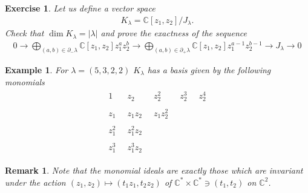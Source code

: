 \documentclass[12pt]{article}
\newtheorem{ex}{Example}[section]
\newtheorem{exer}{Exercise}[section]
\newtheorem{rem}{Remark}[section]
\numberwithin{equation}{section}
\theoremstyle{definition}
\begin{document}
\begin{exer}\normalfont
Let us define a vector space 
\begin{align}\label{klam}
    K_{\lambda} = \mathbb{C}[z_1 , z_2]/J_{\lambda}.
\end{align}    
Check that $\dim K_{\lambda} = |\lambda|$ and prove the exactness of the sequence
\begin{align}\label{resj}
    0 \rightarrow \bigoplus\limits_{(a, b) \in \partial_{-}\lambda} \mathbb{C}[z_1 , z_2] z_1^{a} z_2^{b} \rightarrow \bigoplus\limits_{(a, b) \in \partial_{+}\lambda} \mathbb{C}[z_1 , z_2] z_1^{a-1} z_2^{b-1} \rightarrow J_{\lambda} \rightarrow 0
\end{align}
\end{exer}
\begin{ex}
    For $\lambda = (5, 3, 2, 2)$ $K_{\lambda}$ has a basis given by the following monomials
\begin{align*}
    \begin{matrix}
    1     &\;\; z_2       &\;\; z_2^2     & \;\; z_2^3 &\;\; z_2^4\\\\
    z_1   &\;\; z_1 z_2   &\;\; z_1 z_2^2 & & \\\\
    z_1^2 &\;\; z_1^2 z_2 &\;\;           & & \\\\
    z_1^3 &\;\; z_1^3 z_2 &\;\;           & &
    \end{matrix}
\end{align*}
\end{ex}
\begin{rem}\normalfont
    Note that the monomial ideals are exactly those which are invariant under the action $(z_1 , z_2) \mapsto (t_1 z_1 , t_2 z_2)$ of $\mathbb{C}^{*} \times \mathbb{C}^{*} \ni (t_1, t_2)$ on $\mathbb{C}^{2}$.
\end{rem}
\end{document}
